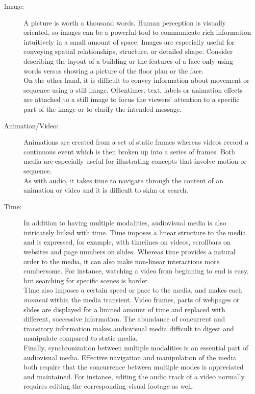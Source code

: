 \begin{description}
\item[Image:] A picture is worth a thousand words. Human perception is visually oriented, so images can be a powerful tool to communicate rich information intuitively in a small amount of space. Images are especially useful for conveying spatial relationships, structure, or detailed shape. Consider describing the layout of a building or the features of a face only using words versus showing a picture of the floor plan or the face.\\ 
On the other hand, it is difficult to convey information about movement or sequence using a still image. Oftentimes, text, labels or animation effects are attached to a still image to focus the viewers' attention to a specific part of the image or to clarify the intended message.\\

\item[Animation/Video:] Animations are created from a set of static frames whereas videos record a continuous event which is then broken up into a series of frames. Both media are especially useful for illustrating concepts that involve motion or sequence.\\
As with audio, it takes time to navigate through the content of an animation or video and it is difficult to skim or search.\\

\item[Time:] In addition to having multiple modalities, audiovisual media is also intricately linked with time. Time imposes a linear structure to the media and is expressed, for example, with timelines on videos, scrollbars on websites and page numbers on slides. Whereas time provides a natural order to the media, it can also make non-linear interactions more cumbersome. For instance, watching a video from beginning to end is easy, but searching for specific scenes is harder.\\
Time also imposes a certain speed or pace to the media, and makes each \textit{moment}  within the media transient. Video frames, parts of webpages or slides are displayed for a limited amount of time and replaced with different, successive information. The abundance of concurrent and transitory information makes audiovisual media difficult to digest and manipulate compared to static media.\\
Finally, synchronization between multiple modalities is an essential part of audiovisual media. Effective navigation and manipulation of the media both require that the concurrence between multiple modes is appreciated and maintained. For instance, editing the audio track of a video normally requires editing the corresponding visual footage as well.
\end{description}

